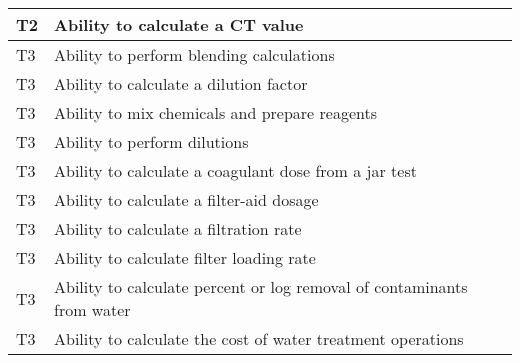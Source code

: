 \begin{table}[H]
\begin{tabular}{| m{1cm} |m{15cm} |}
T2 & Ability to calculate   a CT value                                            \\ \hline
T3 & Ability to perform   blending calculations                                   \\ \hline
T3 & Ability to calculate   a dilution factor                                     \\ \hline
T3 & Ability to mix   chemicals and prepare reagents                              \\ \hline
T3 & Ability to perform   dilutions                                               \\ \hline
T3 & Ability to calculate   a coagulant dose from a jar test                      \\ \hline
T3 & Ability to calculate   a filter-aid dosage                                   \\ \hline
T3 & Ability to calculate   a filtration rate                                     \\ \hline
T3 & Ability to calculate   filter loading rate                                   \\ \hline
T3 & Ability to calculate   percent or log removal of contaminants from water     \\ \hline
T3 & Ability to calculate   the cost of water treatment operations                \\ \hline
\end{tabular}
\end{table}
\newpage










